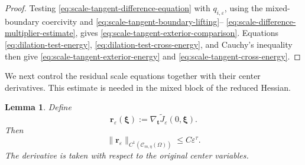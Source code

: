 \documentclass[11pt]{article}
\newtheorem{lemma}[theorem]{Lemma}
\numberwithin{equation}{section}
\begin{document}
\begin{proof}
Testing \eqref{eq:scale-tangent-difference-equation} with
$q_{i,\varepsilon}$, using the mixed-boundary coercivity and
\eqref{eq:scale-tangent-boundary-lifting}--
\eqref{eq:scale-difference-multiplier-estimate}, gives
\eqref{eq:scale-tangent-exterior-comparison}. Equations
\eqref{eq:dilation-test-energy},
\eqref{eq:dilation-test-cross-energy}, and Cauchy's inequality then
give \eqref{eq:scale-tangent-exterior-energy} and
\eqref{eq:scale-tangent-cross-energy}.
\end{proof}


We next control the residual scale equations together with their
center derivatives. This estimate is needed in the mixed block of the
reduced Hessian.

\begin{lemma}\label{lem:scale-defect-C1}
Define
\begin{equation*}
\boldsymbol r_\varepsilon(\boldsymbol\xi)
:=\nabla_{\boldsymbol t}\widetilde J_\varepsilon
(0,\boldsymbol\xi).
\end{equation*}
Then
\begin{equation}\label{eq:scale-defect-C1}
\|\boldsymbol r_\varepsilon\|_{C^1(\mathcal C_{m,\eta}(\Omega))}
\leq C\varepsilon^\tau.
\end{equation}
The derivative is taken with respect to the original center
variables.
\end{lemma}
\end{document}
